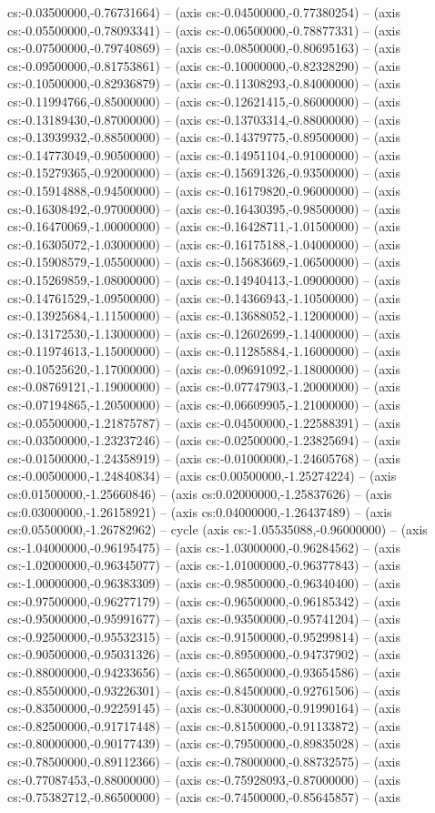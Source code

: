 cs:-0.03500000,-0.76731664) -- (axis cs:-0.04500000,-0.77380254) -- (axis cs:-0.05500000,-0.78093341) -- (axis cs:-0.06500000,-0.78877331) -- (axis cs:-0.07500000,-0.79740869) -- (axis cs:-0.08500000,-0.80695163) -- (axis cs:-0.09500000,-0.81753861) -- (axis cs:-0.10000000,-0.82328290) -- (axis cs:-0.10500000,-0.82936879) -- (axis cs:-0.11308293,-0.84000000) -- (axis cs:-0.11994766,-0.85000000) -- (axis cs:-0.12621415,-0.86000000) -- (axis cs:-0.13189430,-0.87000000) -- (axis cs:-0.13703314,-0.88000000) -- (axis cs:-0.13939932,-0.88500000) -- (axis cs:-0.14379775,-0.89500000) -- (axis cs:-0.14773049,-0.90500000) -- (axis cs:-0.14951104,-0.91000000) -- (axis cs:-0.15279365,-0.92000000) -- (axis cs:-0.15691326,-0.93500000) -- (axis cs:-0.15914888,-0.94500000) -- (axis cs:-0.16179820,-0.96000000) -- (axis cs:-0.16308492,-0.97000000) -- (axis cs:-0.16430395,-0.98500000) -- (axis cs:-0.16470069,-1.00000000) -- (axis cs:-0.16428711,-1.01500000) -- (axis cs:-0.16305072,-1.03000000) -- (axis cs:-0.16175188,-1.04000000) -- (axis cs:-0.15908579,-1.05500000) -- (axis cs:-0.15683669,-1.06500000) -- (axis cs:-0.15269859,-1.08000000) -- (axis cs:-0.14940413,-1.09000000) -- (axis cs:-0.14761529,-1.09500000) -- (axis cs:-0.14366943,-1.10500000) -- (axis cs:-0.13925684,-1.11500000) -- (axis cs:-0.13688052,-1.12000000) -- (axis cs:-0.13172530,-1.13000000) -- (axis cs:-0.12602699,-1.14000000) -- (axis cs:-0.11974613,-1.15000000) -- (axis cs:-0.11285884,-1.16000000) -- (axis cs:-0.10525620,-1.17000000) -- (axis cs:-0.09691092,-1.18000000) -- (axis cs:-0.08769121,-1.19000000) -- (axis cs:-0.07747903,-1.20000000) -- (axis cs:-0.07194865,-1.20500000) -- (axis cs:-0.06609905,-1.21000000) -- (axis cs:-0.05500000,-1.21875787) -- (axis cs:-0.04500000,-1.22588391) -- (axis cs:-0.03500000,-1.23237246) -- (axis cs:-0.02500000,-1.23825694) -- (axis cs:-0.01500000,-1.24358919) -- (axis cs:-0.01000000,-1.24605768) -- (axis cs:-0.00500000,-1.24840834) -- (axis cs:0.00500000,-1.25274224) -- (axis cs:0.01500000,-1.25660846) -- (axis cs:0.02000000,-1.25837626) -- (axis cs:0.03000000,-1.26158921) -- (axis cs:0.04000000,-1.26437489) -- (axis cs:0.05500000,-1.26782962) -- cycle (axis cs:-1.05535088,-0.96000000) -- (axis cs:-1.04000000,-0.96195475) -- (axis cs:-1.03000000,-0.96284562) -- (axis cs:-1.02000000,-0.96345077) -- (axis cs:-1.01000000,-0.96377843) -- (axis cs:-1.00000000,-0.96383309) -- (axis cs:-0.98500000,-0.96340400) -- (axis cs:-0.97500000,-0.96277179) -- (axis cs:-0.96500000,-0.96185342) -- (axis cs:-0.95000000,-0.95991677) -- (axis cs:-0.93500000,-0.95741204) -- (axis cs:-0.92500000,-0.95532315) -- (axis cs:-0.91500000,-0.95299814) -- (axis cs:-0.90500000,-0.95031326) -- (axis cs:-0.89500000,-0.94737902) -- (axis cs:-0.88000000,-0.94233656) -- (axis cs:-0.86500000,-0.93654586) -- (axis cs:-0.85500000,-0.93226301) -- (axis cs:-0.84500000,-0.92761506) -- (axis cs:-0.83500000,-0.92259145) -- (axis cs:-0.83000000,-0.91990164) -- (axis cs:-0.82500000,-0.91717448) -- (axis cs:-0.81500000,-0.91133872) -- (axis cs:-0.80000000,-0.90177439) -- (axis cs:-0.79500000,-0.89835028) -- (axis cs:-0.78500000,-0.89112366) -- (axis cs:-0.78000000,-0.88732575) -- (axis cs:-0.77087453,-0.88000000) -- (axis cs:-0.75928093,-0.87000000) -- (axis cs:-0.75382712,-0.86500000) -- (axis cs:-0.74500000,-0.85645857) -- (axis 